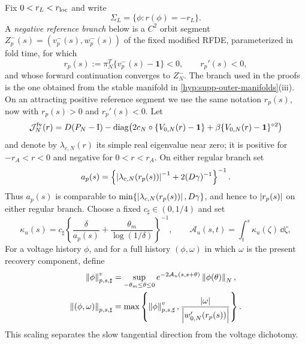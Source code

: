 Fix \(0<r_L<r_{\rm loc}\) and write
\begin{equation}
 \Sigma_L=\{\phi:r(\phi)=-r_L\}.
 \label{eq:supp-negative-regular-section}
\end{equation}
A \emph{negative reference branch} below is a \(C^2\) orbit segment
\(Z_p^-(s)=(v_p^-(s),w_p^-(s))\) of the fixed modified RFDE, parameterized in
fold time, for which
\[
 r_p(s):=\pi_N^T\{v_p^-(s)-\mathbf1\}<0,
 \qquad r_p'(s)<0,
\]
and whose forward continuation converges to \(Z_N^-\).  The branch used in
the proofs is the one obtained from the stable manifold in
\cref{hyp:supp-outer-manifolds}(iii).  On an attracting positive reference
segment we use the same notation \(r_p(s)\), now with \(r_p(s)>0\) and
\(r_p'(s)<0\).  Let
\begin{equation}
 \mathcal J_N^{\rm fv}(r)
 =D(P_N-\mathrm I)-\operatorname{diag}\!\left(
 2c_N\circ\{V_{0,N}(r)-\mathbf1\}
 +\beta\{V_{0,N}(r)-\mathbf1\}^{\circ2}\right)
 \label{eq:supp-frozen-voltage-jacobian}
\end{equation}
and denote by \(\lambda_{c,N}(r)\) its simple real eigenvalue near zero; it
is positive for \(-r_A<r<0\) and negative for \(0<r<r_A\).  On either
regular branch set
\begin{equation}
 a_p(s)=\left\{\left\lvert\lambda_{c,N}(r_p(s))\right\rvert^{-1}
                    +2(D\gamma)^{-1}\right\}^{-1}.
 \label{eq:supp-capped-voltage-rate}
\end{equation}
Thus \(a_p(s)\) is comparable to
\(\min\{\left\lvert\lambda_{c,N}(r_p(s))\right\rvert,D\gamma\}\), and hence to
\(\left\lvert r_p(s)\right\rvert\) on either regular branch.  Choose a fixed
\(c_\sharp\in(0,1/4)\) and
set
\begin{equation}
 \kappa_u(s)=c_\sharp
 \left\{\frac{\delta}{a_p(s)}
       +\frac{\theta_m}{\log(1/\delta)}\right\}^{-1},
 \qquad
 \mathcal A_u(s,t)=\int_t^s\kappa_u(\zeta)\,\dd\zeta,
 \label{eq:supp-dichotomy-action}
\end{equation}
For a voltage history \(\phi\), and for a full history
\((\phi,\omega)\) in which \(\omega\) is the present recovery component,
define
\begin{align}
 \left\lVert\phi\right\rVert_{p,s,\sharp}^{v}
 &=\sup_{-\theta_m\le\theta\le0}
   e^{-2\mathcal A_u(s,s+\theta)}\left\lVert\phi(\theta)\right\rVert_N,\notag\\
 \left\lVert(\phi,\omega)\right\rVert_{p,s,\sharp}
 &=\max\left\{\left\lVert\phi\right\rVert_{p,s,\sharp}^{v},
       \frac{\left\lvert\omega\right\rvert}{\left\lvert w_{0,N}'(r_p(s))\right\rvert}\right\}.
 \label{eq:supp-fading-history-norm}
\end{align}
This scaling separates the slow tangential direction from the voltage
dichotomy.

